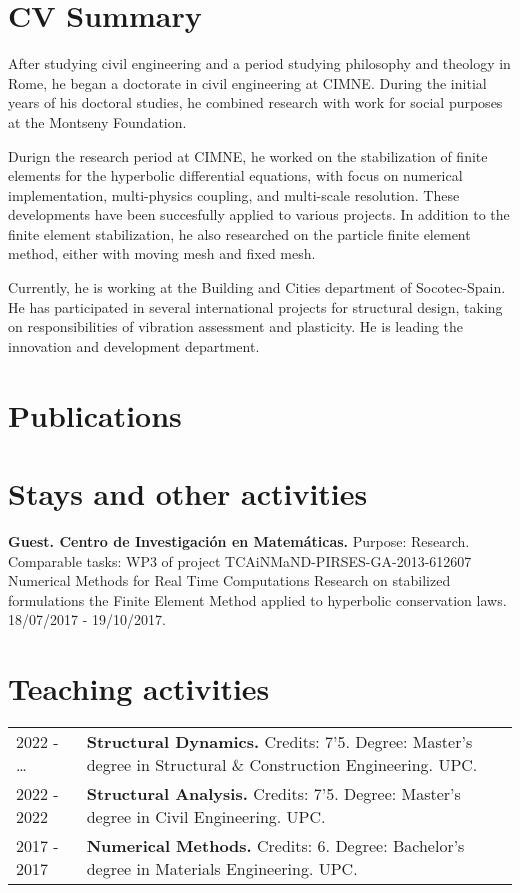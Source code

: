 \documentclass[12pt]{article}
\begin{document}
\section{CV Summary}
After studying civil engineering and a period studying philosophy and theology in Rome, he began
a doctorate in civil engineering at CIMNE. During the initial years of his doctoral studies, he combined
research with work for social purposes at the Montseny Foundation.

Durign the research period at CIMNE, he worked on the stabilization of finite elements for the hyperbolic
differential equations, with focus on numerical implementation, multi-physics coupling, and multi-scale
resolution. These developments have been succesfully applied to various projects. In addition to
the finite element stabilization, he also researched on the particle finite element method, either
with moving mesh and fixed mesh.

Currently, he is working at the Building and Cities department of Socotec-Spain. He has participated
in several international projects for structural design, taking on responsibilities of vibration
assessment and plasticity. He is leading the innovation and development department.


\section{Publications}
\nocite{*}
\printbibliography[heading={subbibliography}, title={Journal papers}, type=article]
\printbibliography[heading={subbibliography}, title={Theses}, type=thesis]
\printbibliography[heading={subbibliography}, title={Conferences}, type=inproceedings]


\section{Stays and other activities}
\textbf{Guest. Centro de Investigación en Matemáticas.} Purpose: Research. Comparable tasks: WP3 of project
TCAiNMaND-PIRSES-GA-2013-612607 Numerical Methods for Real Time Computations Research on stabilized
formulations the Finite Element Method applied to hyperbolic conservation laws. 18/07/2017 - 19/10/2017.


\section{Teaching activities}
\begin{tabularx}{\linewidth}{lX}
    2022 - \enskip \dots &
    \textbf{Structural Dynamics.} Credits: 7'5. Degree: Master's degree in Structural \& Construction Engineering. UPC. \\

    2022 - 2022 &
    \textbf{Structural Analysis.} Credits: 7'5. Degree: Master's degree in Civil Engineering. UPC. \\

    2017 - 2017 &
    \textbf{Numerical Methods.} Credits: 6. Degree: Bachelor's degree in Materials Engineering. UPC. \\
\end{tabularx}
\end{document}
